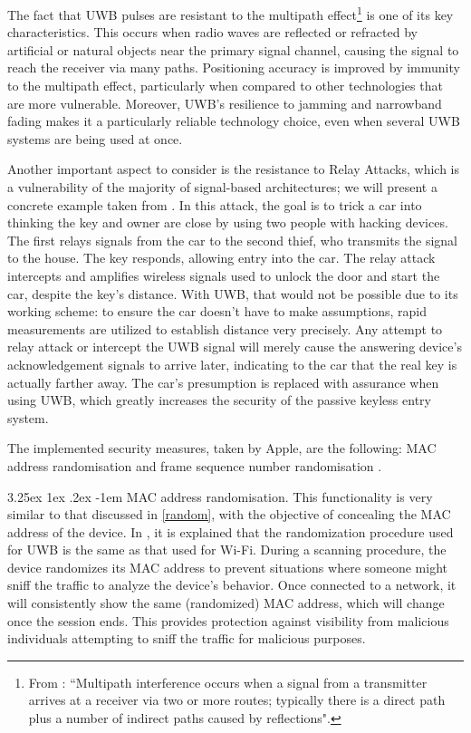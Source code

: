 \documentclass[english]{article}
\makeatletter
\newcounter{subsubsubsection}[subsubsection]
\renewcommand\paragraph{\@startsection{paragraph}{5}{\z@}%
  {3.25ex \@plus1ex \@minus.2ex}%
  {-1em}%
  {\normalfont\normalsize\bfseries}}
\makeatother
\begin{document}
The fact that UWB pulses are resistant to the multipath effect\footnote{From \cite{Figueroa2022}: ``Multipath interference occurs when a signal from a transmitter arrives at a receiver via two or more routes; typically there is a direct path plus a number of indirect paths caused by reflections".} is one of its key characteristics. This occurs when radio waves are reflected or refracted by artificial or natural objects near the primary signal channel, causing the signal to reach the receiver via many paths. Positioning accuracy is improved by immunity to the multipath effect, particularly when compared to other technologies that are more vulnerable. Moreover, UWB's resilience to jamming and narrowband fading makes it a particularly reliable technology choice, even when several UWB systems are being used at once.

Another important aspect to consider is the resistance to Relay Attacks, which is a vulnerability of the majority of signal-based architectures; we will present a concrete example taken from \cite{Global_2020}. In this attack, the goal is to trick a car into thinking the key and owner are close by using two people with hacking devices. The first relays signals from the car to the second thief, who transmits the signal to the house. The key responds, allowing entry into the car. The relay attack intercepts and amplifies wireless signals used to unlock the door and start the car, despite the key's distance. With UWB, that would not be possible due to its working scheme: to ensure the car doesn't have to make assumptions, rapid measurements are utilized to establish distance very precisely. Any attempt to relay attack or intercept the UWB signal will merely cause the answering device's acknowledgement signals to arrive later, indicating to the car that the real key is actually farther away. The car's presumption is replaced with assurance when using UWB, which greatly increases the security of the passive keyless entry system.

The implemented security measures, taken by Apple, are the following: MAC address randomisation and frame sequence number randomisation \cite{aps}.

\paragraph{MAC address randomisation.}
This functionality is very similar to that discussed in \ref{random}, with the objective of concealing the MAC address of the device. In \cite{aps}, it is explained that the randomization procedure used for UWB is the same as that used for Wi-Fi. During a scanning procedure, the device randomizes its MAC address to prevent situations where someone might sniff the traffic to analyze the device's behavior. Once connected to a network, it will consistently show the same (randomized) MAC address, which will change once the session ends. This provides protection against visibility from malicious individuals attempting to sniff the traffic for malicious purposes.
\end{document}
